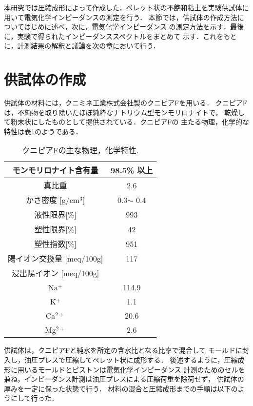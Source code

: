 本研究では圧縮成形によって作成した，ペレット状の不飽和粘土を実験供試体に
用いて電気化学インピーダンスの測定を行う．
本節では，供試体の作成方法についてはじめに述べ，次に，電気化学インピーダンス
の測定方法を示す．最後に，実験で得られたインピーダンススペクトルをまとめて
示す．これをもとに，計測結果の解釈と議論を次の章において行う．
\section{供試体の作成}
供試体の材料には，クニミネ工業株式会社製のクニピアFを用いる．
クニピアFは，不純物を取り除いたほぼ純粋なナトリウム型モンモリロナイトで，
乾燥して粉末状にしたものとして提供されている．クニピアFの
主たる物理，化学的な特性は表\ref{tbl:kunipia}のようである．
\begin{table}[h]
\begin{center}
\caption{クニピアFの主な物理，化学特性.}
\begin{tabular}{|c||c|}
	\hline
	モンモリロナイト含有量 & 98.5\% 以上\\
	\hline
	真比重 & 2.6 \\
	\hline
	かさ密度 [g/cm$^3$]& 0.3$\sim$ 0.4 \\
	\hline 
	液性限界[\%] & 993 \\
	\hline 
	塑性限界[\%] & 42 \\
	\hline 
	塑性指数[\%] & 951 \\
	\hline 
	陽イオン交換量 [meq/100g] &  117\\
	\hline 
	浸出陽イオン [meq/100g] &  \\
	\hline 
	Na$^+$ & 114.9\\
	\hline 
	K$^+$ & 1.1\\
	\hline 
	Ca$^{2+}$ & 20.6\\
	\hline 
	Mg$^{2+}$ & 2.6 \\
	\hline 
\end{tabular}
\label{tbl:kunipia}
\end{center}
\end{table}
供試体は，クニピアFと純水を所定の含水比となる比率で混合して
モールドに封入し，油圧プレスで圧縮してペレット状に成形する．
後述するように，圧縮成形に用いるモールドとピストンは電気化学インピーダンス
計測のためのセルを兼ね，インピーダンス計測は油圧プレスによる圧縮荷重を除荷せず，
供試体の厚みを一定に保った状態で行う．
材料の混合と圧縮成形までの手順は以下のようにして行った．
